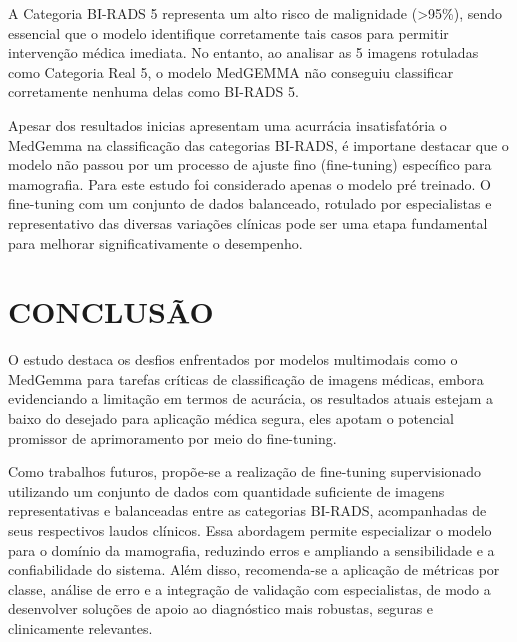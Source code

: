 \documentclass[12pt]{article}
\begin{document}
A Categoria BI-RADS 5 representa um alto risco de malignidade (>95\%), sendo essencial que o modelo identifique corretamente tais casos para permitir intervenção médica imediata. No entanto, ao analisar as 5 imagens rotuladas como Categoria Real 5, o modelo MedGEMMA não conseguiu classificar corretamente nenhuma delas como BI-RADS 5. 

Apesar dos resultados inicias apresentam uma acurrácia insatisfatória o MedGemma na classificação das categorias BI-RADS, é importane destacar que o modelo não passou por um processo de ajuste fino (fine-tuning) específico para mamografia. Para este estudo foi considerado apenas o modelo pré treinado. O fine-tuning com um conjunto de dados balanceado, rotulado por especialistas e representativo das diversas variações clínicas pode ser uma etapa fundamental para melhorar significativamente o desempenho. 

\section{CONCLUSÃO}

O estudo destaca os desfios enfrentados por modelos multimodais como o MedGemma para tarefas críticas de classificação de imagens médicas, embora evidenciando a limitação em termos de acurácia, os resultados atuais estejam a baixo do desejado para aplicação médica segura, eles apotam o potencial promissor de aprimoramento por meio do fine-tuning.  

Como trabalhos futuros, propõe-se a realização de fine-tuning supervisionado utilizando um conjunto de dados com quantidade suficiente de imagens representativas e balanceadas entre as categorias BI-RADS, acompanhadas de seus respectivos laudos clínicos. Essa abordagem permite especializar o modelo para o domínio da mamografia, reduzindo erros e ampliando a sensibilidade e a confiabilidade do sistema. Além disso, recomenda-se a aplicação de métricas por classe, análise de erro e a integração de validação com especialistas, de modo a desenvolver soluções de apoio ao diagnóstico mais robustas, seguras e clinicamente relevantes. 






\end{document}
